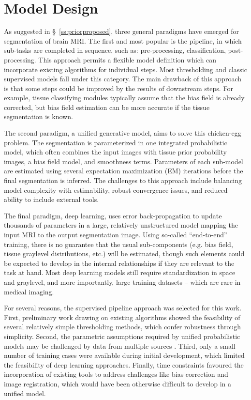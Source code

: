 \section{Model Design}\label{s:modelconcept}
As suggested in \S\ \ref{ss:priorproposed}, three general paradigms have emerged for segmentation of brain MRI.
The first and most popular is the pipeline, in which sub-tasks are completed in sequence, such as: pre-processing, classification, post-processing.
This approach permits a flexible model definition which can incorporate existing algorithms for individual steps.
Most thresholding and classic supervised models fall under this category.
The main drawback of this approach is that some steps could be improved by the results of downstream steps.
For example, tissue classifying modules typically assume that the bias field is already corrected, but bias field estimation can be more accurate if the tissue segmentation is known.
\par
The second paradigm, a unified generative model, aims to solve this chicken-egg problem.
The segmentation is parameterized in one integrated probabilistic model, which often combines the input images with tissue prior probability images, a bias field model, and smoothness terms.
Parameters of each sub-model are estimated using several expectation maximization (EM) iterations before the final segmentation is inferred.
The challenges to this approach include balancing model complexity with estimability, robust convergence issues, and reduced ability to include external tools.
\par
The final paradigm, deep learning, uses error back-propagation to update thousands of parameters in a large, relatively unstructured model mapping the input MRI to the output segmentation image.
Using so-called ``end-to-end'' training, there is no guarantee that the usual sub-components (e.g. bias field, tissue graylevel distributions, etc.) will be estimated, though such elements could be expected to develop in the internal relationships if they are relevant to the task at hand.
Most deep learning models still require standardization in space and graylevel, and more importantly, large training datasets -- which are rare in medical imaging.
\par
For several reasons, the supervised pipeline approach was selected for this work.
First, preliminary work drawing on existing algorithms \cite{Khademi2014,Schmidt2015} showed the feasibility of several relatively simple thresholding methods, which confer robustness through simplicity.
Second, the parametric assumptions required by unified probabilistic models may be challenged by data from multiple sources \cite{VanLeemput2001}.
Third, only a small number of training cases were available during initial development, which limited the feasibility of deep learning approaches.
Finally, time constraints favoured the incorporation of existing tools to address challenges like bias correction and image registration, which would have been otherwise difficult to develop in a unified model.
